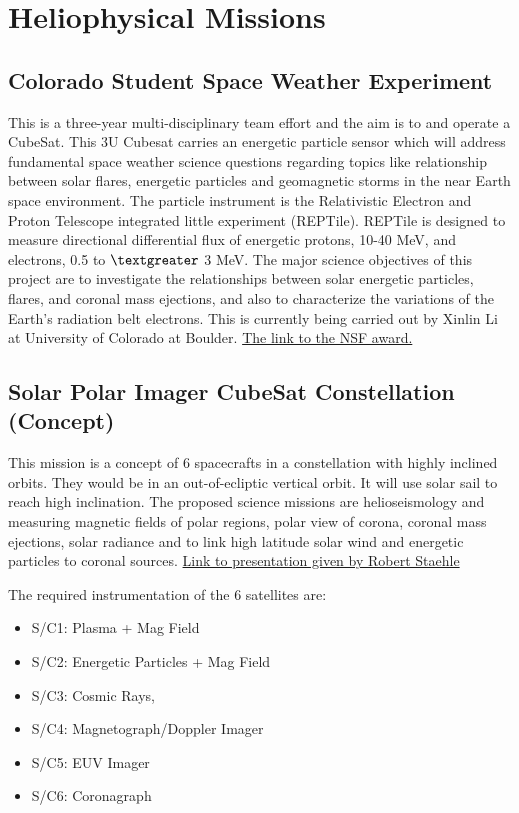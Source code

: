 \section{Heliophysical Missions}

\subsection{Colorado Student Space Weather Experiment}

This is a three-year multi-disciplinary team effort and the aim is to and operate a CubeSat. This 3U Cubesat carries an energetic particle sensor which will address fundamental space weather science questions regarding topics like relationship between solar flares, energetic particles and geomagnetic storms in the near Earth space environment. The particle instrument is the Relativistic Electron and Proton Telescope integrated little experiment (REPTile). REPTile is designed to measure directional differential flux of energetic protons, 10-40 MeV, and electrons, 0.5 to $\textgreater$ 3 MeV.  The major science objectives of this project are to investigate the relationships between solar energetic particles, flares, and coronal mass ejections, and also to characterize the variations of the Earth's radiation belt electrons. This is currently being carried out by Xinlin Li at University of Colorado at Boulder. \href{http://nsf.gov/awardsearch/showAward?AWD_ID=1042815&HistoricalAwards=false}{The link to the NSF award.}

\subsection{Solar Polar Imager CubeSat Constellation (Concept)}
This mission is a concept of 6 spacecrafts in a constellation with highly inclined orbits. They would be in an out-of-ecliptic vertical orbit. It will use solar sail to reach high inclination. The proposed science missions are helioseismology and measuring magnetic fields of polar regions, polar view of corona, coronal mass ejections, solar radiance and to link high latitude solar wind and energetic particles to coronal sources.  \href{http://kiss.caltech.edu/cosponsored/cubesat2012/presentations/staehle-interplanetary-cubesat-missions.pdf}{Link to presentation given by Robert Staehle}

The required instrumentation of the 6  satellites are:
\begin{itemize}
\item S/C1: Plasma + Mag Field 
\item S/C2: Energetic Particles + Mag Field 
\item S/C3: Cosmic Rays, 
\item S/C4: Magnetograph/Doppler Imager 
\item S/C5: EUV Imager 
\item S/C6: Coronagraph 
\end{itemize}


